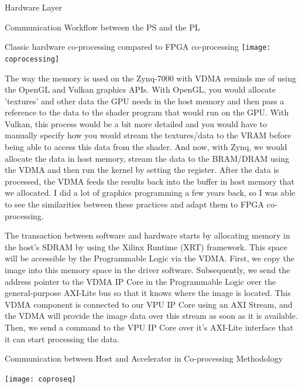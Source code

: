 \documentclass{matthijs}
\begin{document}
\begin{hoofdstuk}{Hardware Layer}
\begin{paragraaf}{Communication Workflow between the PS and the PL}
			\vspace{-0.6ex}
			\begin{figuur}{Classic hardware co-processing compared to FPGA co-processing}
				\singlespacing
				\texttt{[image: coprocessing]}
				\onehalfspacing
				\vspace{-2ex}
			\end{figuur}
			\vspace{-0.2ex}

			The way the memory is used on the Zynq-7000 with VDMA reminds me of using the OpenGL and Vulkan graphics APIs.
			With OpenGL, you would allocate 'textures' and other data the GPU needs in the host memory and then pass a reference to the data to the shader program that would run on the GPU.
			With Vulkan, this process would be a bit more detailed and you would have to manually specify how you would stream the textures/data to the VRAM before being able to access this data from the shader.
			And now, with Zynq, we would allocate the data in host memory, stream the data to the BRAM/DRAM using the VDMA and then run the kernel by setting the register.
			After the data is processed, the VDMA feeds the results back into the buffer in host memory that we allocated.
			I did a lot of graphics programming a few years back, so I was able to see the similarities between these practices and adapt them to FPGA co-processing.
			
			\bigskip

			The transaction between software and hardware starts by allocating memory in the host's SDRAM by using the Xilinx Runtime (XRT) framework.
			This space will be accessible by the Programmable Logic via the VDMA.
			First, we copy the image into this memory space in the driver software.
			Subsequently, we send the address pointer to the VDMA IP Core in the Programmable Logic over the general-purpose AXI-Lite bus so that it knows where the image is located.
			This VDMA component is connected to our VPU IP Core using an AXI Stream, and the VDMA will provide the image data over this stream as soon as it is available.
			Then, we send a command to the VPU IP Core over it's AXI-Lite interface that it can start processing the data.

			\vspace{-0.6ex}
			\begin{figuur}{Communication between Host and Accelerator in Co-processing Methodology}
				\singlespacing
				\begin{adjustbox}{width=\textwidth,center}
					\texttt{[image: coproseq]}
				\end{adjustbox}
				\onehalfspacing
				\vspace{-2ex}
			\end{figuur}
			\vspace{-0.2ex}


\end{paragraaf}
\end{hoofdstuk}
\end{document}
